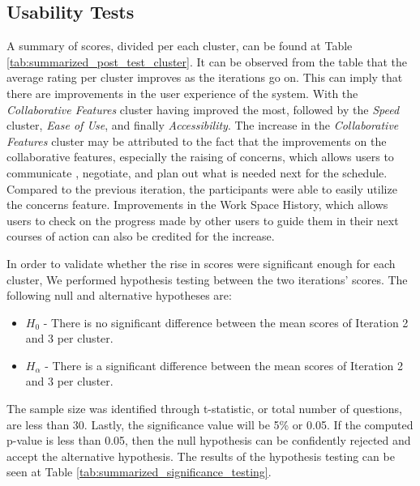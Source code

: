
\subsection{Usability Tests}

A summary of scores, divided per each cluster, can be found at Table \ref{tab:summarized_post_test_cluster}. It can be observed from the table that the average rating per cluster improves as the iterations go on. This can imply that there are improvements in the user experience of the system. With the \textit{Collaborative Features} cluster having improved the most, followed by the \textit{Speed} cluster, \textit{Ease of Use}, and finally \textit{Accessibility}. The increase in the \textit{Collaborative Features} cluster may be attributed to the fact that the improvements on the collaborative features, especially the raising of concerns, which allows users to communicate , negotiate, and plan out what is needed next for the schedule. Compared to the previous iteration, the participants were able to easily utilize the concerns feature. Improvements in the Work Space History, which allows users to check on the progress made by other users to guide them in their next courses of action can also be credited for the increase. 

In order to validate whether the rise in scores were significant enough for each cluster, We performed hypothesis testing between the two iterations' scores. The following null and alternative hypotheses are: 
 \label{list:significance_testing}
 \begin{itemize}
    \item $H_0$ - There is no significant difference between the mean scores of Iteration 2 and 3 per cluster.
    \item $H_\alpha$ - There is a significant difference between the mean scores of Iteration 2 and 3 per cluster.
\end{itemize}

The sample size was identified through t-statistic, or total number of questions, are less than 30. Lastly, the significance value will be 5\% or 0.05. If the computed p-value is less than 0.05, then the null hypothesis can be confidently rejected and accept the alternative hypothesis. The results of the hypothesis testing can be seen at Table \ref{tab:summarized_significance_testing}.

